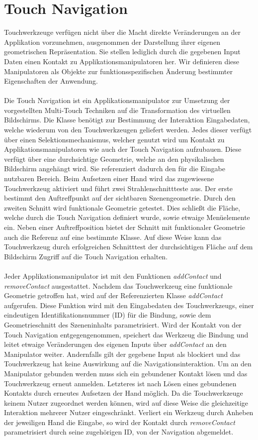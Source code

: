 \section{Touch Navigation}
\label{sec:touch_navigation}

Touchwerkzeuge verfügen nicht über die Macht direkte Veränderungen an der Applikation vorzunehmen, ausgenommen der Darstellung ihrer eigenen geometrischen Repräsentation. Sie stellen lediglich durch die gegebenen Input Daten einen Kontakt zu Applikationsmanipulatoren her. Wir definieren diese Manipulatoren als Objekte zur funktionsspezifischen Änderung bestimmter Eigenschaften der Anwendung.
\\\\
Die Touch Navigation ist ein Applikationsmanipulator zur Umsetzung der vorgestellten Multi-Touch Techniken auf die Transformation des virtuellen Bildschirms. Die Klasse benötigt zur Bestimmung der Interaktion Eingabedaten, welche wiederum von den Touchwerkzeugen geliefert werden. Jedes dieser verfügt über einen Selektionsmechanismus, welcher genutzt wird um Kontakt zu Applikationsmanipulatoren wie auch der Touch Navigation aufzubauen. Diese verfügt über eine durchsichtige Geometrie, welche an den physikalischen Bildschirm angehängt wird. Sie referenziert dadurch den für die Eingabe nutzbaren Bereich. Beim Aufsetzen einer Hand wird das zugewiesene Touchwerkzeug aktiviert und führt zwei Strahlenschnittteste aus. Der erste bestimmt den Auftreffpunkt auf der sichtbaren Szenengeometrie. Durch den zweiten Schnitt wird funktionale Geometrie getestet. Dies schließt die Fläche, welche durch die Touch Navigation definiert wurde, sowie etwaige Menüelemente ein. Neben einer Auftreffposition bietet der Schnitt mit funktionaler Geometrie auch die Referenz auf eine bestimmte Klasse. Auf diese Weise kann das Touchwerkzeug durch erfolgreichen Schnitttest der durchsichtigen Fläche auf dem Bildschirm Zugriff auf die Touch Navigation erhalten.
\\\\
Jeder Applikationsmanipulator ist mit den Funktionen \emph{addContact} und \emph{removeContact} ausgestattet. Nachdem das Touchwerkzeug eine funktionale Geometrie getroffen hat, wird auf der Referenzierten Klasse \emph{addContact} aufgerufen. Diese Funktion wird mit den Eingabedaten des Touchwerkzeugs, einer eindeutigen Identifikationsnummer (ID) für die Bindung, sowie dem Geometrieschnitt des Szeneninhalts parametrisiert. Wird der Kontakt von der Touch Navigation entgegengenommen, speichert das Werkzeug die Bindung und leitet etwaige Veränderungen des eigenen Inputs über \emph{addContact} an den Manipulator weiter. Andernfalls gilt der gegebene Input als blockiert und das Touchwerkzeug hat keine Auswirkung auf die Navigationsinteraktion. Um an den Manipulator gebunden werden muss sich ein gebundener Kontakt lösen und das Touchwerkzeug erneut anmelden. Letzteres ist nach Lösen eines gebundenen Kontakts durch erneutes Aufsetzen der Hand möglich. Da die Touchwerkzeuge keinem Nutzer zugeordnet werden können, wird auf diese Weise die gleichzeitige Interaktion mehrerer Nutzer eingeschränkt. Verliert ein Werkzeug durch Anheben der jeweiligen Hand die Eingabe, so wird der Kontakt durch \emph{removeContact} parametrisiert durch seine zugehörigen ID, von der Navigation abgemeldet.

